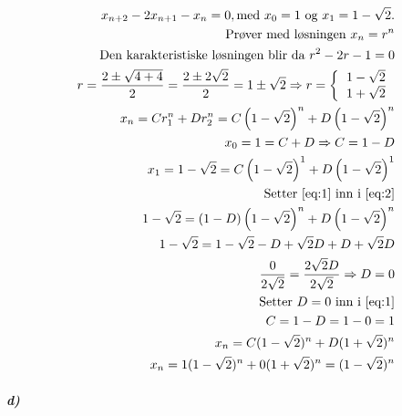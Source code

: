 \documentclass[11pt,norsk]{article}
\begin{document}
				\begin{align}				
x_{n+2} - 2x_{n+1} - x_{n} = 0, \text{med $x_0 = 1$ og $x_1 = 1-\sqrt{2}$.} \\
\text{Prøver med løsningen $x_{n} = r^{n}$} \\
\text{Den karakteristiske løsningen blir da $r^{2} - 2r - 1 = 0$} \nonumber \\
r = \dfrac{2 \pm \sqrt{4+4}}{2} = \dfrac{2\pm 2\sqrt{2}}{2} = 1 \pm \sqrt{2} \Rightarrow r =
\left \{
\begin{tabular}{c}
$1 - \sqrt{2}$ \\ 
$1 + \sqrt{2}$
\end{tabular} \right. \\
\vspace{3mm}
x_n = Cr_1^n + Dr_2^n = C \left( 1 - \sqrt{2} \right) ^n + D \left(1 - \sqrt{2}\right)^n \\
\vspace{3mm}
x_0 = 1 = C + D \Rightarrow C = 1 - D \label{eq:1}\\
\vspace{1mm}
x_1 = 1 - \sqrt{2} = C\left(1 - \sqrt{2}\right)^1 + D\left(  1 - \sqrt{2} \right)^1 \label{eq:2} \\
\text{Setter \eqref{eq:1} inn i \eqref{eq:2}} \nonumber \\
1 - \sqrt{2} = \left(1 - D\right)  \left(1 - \sqrt{2}\right)^n + D\left(1 - \sqrt{2}\right)^n \nonumber \\
1 - \sqrt{2} = 1 - \sqrt{2} - D + \sqrt{2} D + D + \sqrt{2} D \nonumber \\
\dfrac{0}{2 \sqrt{2}} = \dfrac{2 \sqrt{2} D}{2 \sqrt{2}} \Rightarrow D = 0 \\
\text{Setter $D = 0$ inn i \eqref{eq:1}} \nonumber \\
C = 1 - D = 1 - 0 = 1 \\
x_n = C(1 - \sqrt{2})^n + D(1 + \sqrt{2})^n \nonumber \\
x_n = 1(1 - \sqrt{2})^n + 0(1 + \sqrt{2})^n = (1 - \sqrt{2})^n
				\end{align}
			\subparagraph{d)}
\end{document}
